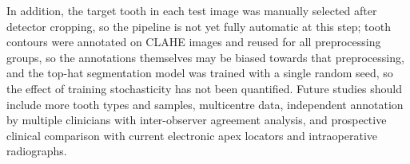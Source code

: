 In addition, the target tooth in each test image was manually selected after detector cropping, so the pipeline is not yet fully automatic at this step; tooth contours were annotated on CLAHE images and reused for all preprocessing groups, so the annotations themselves may be biased towards that preprocessing, and the top-hat segmentation model was trained with a single random seed, so the effect of training stochasticity has not been quantified. Future studies should include more tooth types and samples, multicentre data, independent annotation by multiple clinicians with inter-observer agreement analysis, and prospective clinical comparison with current electronic apex locators and intraoperative radiographs.
